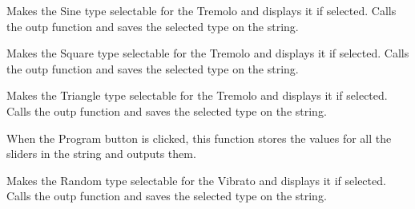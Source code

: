 \documentclass[letterpaper,10pt,english]{sphinxmanual}
\begin{document}

\begin{fulllineitems}
\label{Code:GUI.tremoloSINE_val}
Makes the Sine type selectable for the Tremolo and displays it if selected. Calls the outp function and saves the selected 
type on the string.

\end{fulllineitems}


\begin{fulllineitems}
\label{Code:GUI.tremoloSQUARE_val}
Makes the Square type selectable for the Tremolo and displays it if selected. Calls the outp function and saves the selected 
type on the string.

\end{fulllineitems}


\begin{fulllineitems}
\label{Code:GUI.tremoloTRIANGLE_val}
Makes the Triangle type selectable for the Tremolo and displays it if selected. Calls the outp function and saves the selected 
type on the string.

\end{fulllineitems}


\begin{fulllineitems}
\label{Code:GUI.update_send}
When the Program button is clicked, this function stores the values for all the sliders in the string and outputs them.

\end{fulllineitems}


\begin{fulllineitems}
\label{Code:GUI.vibratoRANDOM_val}
Makes the Random type selectable for the Vibrato and displays it if selected. Calls the outp function and saves the selected 
type on the string.

\end{fulllineitems}
\end{document}

